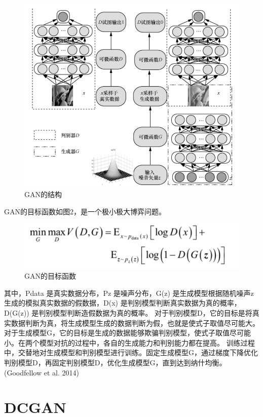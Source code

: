 \documentclass[
  hyperref, a4paper]{ctexart}
\begin{document}
\begin{figure}
\centering
\includegraphics{1.png}
\caption{GAN的结构}
\end{figure}

GAN的目标函数如图2，是一个极小极大博弈问题。

\begin{figure}
\centering
\includegraphics{2.png}
\caption{GAN的目标函数}
\end{figure}

其中，Pdata 是真实数据分布，Pz 是噪声分布，G(z) 是生成模型根据随机噪声z
生成的模拟真实数据的假数据，D(x)
是判别模型判断真实数据为真的概率，D(G(z))
是判别模型判断造假数据为真的概率。
对于判别模型D，它的目标是将真实数据判断为真，将生成模型生成的数据判断为假，也就是使式子取值尽可能大。对于生成模型G，它的目标是生成的数据能够欺骗判别模型，使式子取值尽可能小。在两个模型对抗的过程中，各自的生成能力和判别能力都在提高。
训练过程中，交替地对生成模型和判别模型进行训练。固定生成模型G，通过梯度下降优化判别模型D，再固定判别模型D，优化生成模型G，直到达到纳什均衡。(Goodfellow
et al. 2014)

\hypertarget{dcgan}{%
\section{DCGAN}\label{dcgan}}
\end{document}
